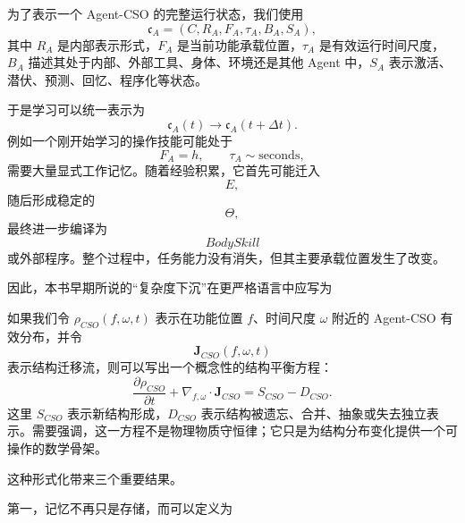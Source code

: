 为了表示一个 Agent-CSO 的完整运行状态，我们使用
\begin{equation}
\mathfrak{c}_{A}
=
(C,R_A,F_A,\tau_A,B_A,S_A),
\end{equation}
其中 $R_A$ 是内部表示形式，$F_A$ 是当前功能承载位置，$\tau_A$ 是有效运行时间尺度，$B_A$ 描述其处于内部、外部工具、身体、环境还是其他 Agent 中，$S_A$ 表示激活、潜伏、预测、回忆、程序化等状态。

于是学习可以统一表示为
\begin{equation}
\boxed{
\mathfrak{c}_{A}(t)
\rightarrow
\mathfrak{c}_{A}(t+\Delta t).
}
\end{equation}
例如一个刚开始学习的操作技能可能处于
\begin{equation}
F_A=h,\qquad
\tau_A\sim\mathrm{seconds},
\end{equation}
需要大量显式工作记忆。随着经验积累，它首先可能迁入
\begin{equation}
E,
\end{equation}
随后形成稳定的
\begin{equation}
\Theta,
\end{equation}
最终进一步编译为
\begin{equation}
BodySkill
\end{equation}
或外部程序。整个过程中，任务能力没有消失，但其主要承载位置发生了改变。

因此，本书早期所说的“复杂度下沉”在更严格语言中应写为
\begin{statementbox}
\centering
{}
\end{statementbox}

如果我们令 $\rho_{CSO}(f,\omega,t)$ 表示在功能位置 $f$、时间尺度 $\omega$ 附近的 Agent-CSO 有效分布，并令
\begin{equation}
\mathbf{J}_{CSO}(f,\omega,t)
\end{equation}
表示结构迁移流，则可以写出一个概念性的结构平衡方程：
\begin{equation}
\frac{\partial \rho_{CSO}}{\partial t}
+
\nabla_{f,\omega}\cdot
\mathbf{J}_{CSO}
=
S_{CSO}
-
D_{CSO}.
\end{equation}
这里 $S_{CSO}$ 表示新结构形成，$D_{CSO}$ 表示结构被遗忘、合并、抽象或失去独立表示。需要强调，这一方程不是物理物质守恒律；它只是为结构分布变化提供一个可操作的数学骨架。

这种形式化带来三个重要结果。

第一，记忆不再只是存储，而可以定义为
\begin{statementbox}
\centering
{}
\end{statementbox}

